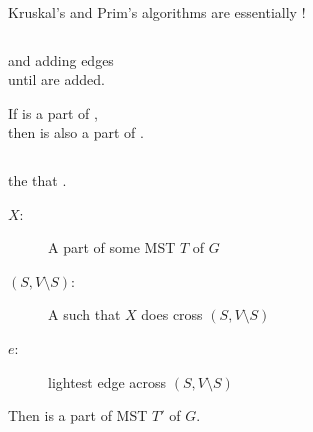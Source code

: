 
\begin{frame}{}
  \begin{center}
    Kruskal's and Prim's algorithms are essentially !
  \end{center}

  \begin{columns}
  \end{columns}

  \pause
  \vspace{0.30cm}
  \begin{center}
     and 
    adding  edges \\[5pt]
    until  are added.
  \end{center}
\end{frame}

\begin{frame}{}
  \begin{center}
    If  is a part of , \\[5pt]
    then  is also a part of .
  \end{center}

  \begin{columns}
  \end{columns}

  \pause
  \vspace{0.30cm}
  \begin{center}
    the  that .
  \end{center}
\end{frame}

\begin{frame}{}
  \begin{theorem}
    \begin{description}
      \item[$X:$] A part of some MST $T$ of $G$
      \item[$(S, V \setminus S):$] A  such that $X$ does  cross $(S, V \setminus S)$
      \item[$e:$]  lightest edge across $(S, V \setminus S)$
    \end{description}

    \begin{center}
      {Then  is a part of  MST $T'$ of $G$.}
    \end{center}
  \end{theorem}
\end{frame}

